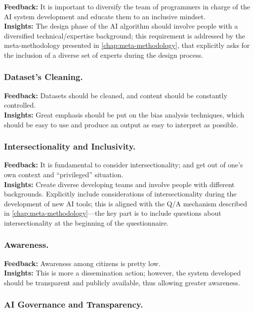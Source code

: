 \documentclass[12pt,a4paper,openright,twoside]{book}
\begin{document}
\textbf{Feedback:} It is important to diversify the team of programmers in charge of the AI system development and educate them to an inclusive mindset.
\\
\textbf{Insights:} The design phase of the AI algorithm should involve people with a diversified technical/expertise background; this requirement is addressed by the meta-methodology presented in \cref{chap:meta-methodology}, that explicitly asks for the inclusion of a diverse set of experts during the design process.

\subsubsection{Dataset's Cleaning.}

\textbf{Feedback:} Datasets should be cleaned, and content should be constantly controlled.
\\
\textbf{Insights:} Great emphasis should be put on the bias analysis techniques, which should be easy to use and produce an output as easy to interpret as possible.

\subsubsection{Intersectionality and Inclusivity.}

\textbf{Feedback:} It is fundamental to consider intersectionality; and get out of one's own context and ``privileged'' situation.
\\
\textbf{Insights:} Create diverse developing teams and involve people with different backgrounds.
%
Explicitly include considerations of intersectionality during the development of new AI tools; this is aligned with the Q/A mechanism described in \cref{chap:meta-methodology}---the key part is to include questions about intersectionality at the beginning of the questionnaire.

\subsubsection{Awareness.}

\textbf{Feedback:} Awareness among citizens is pretty low.
\\
\textbf{Insights:} This is more a dissemination action; however, the system developed should be transparent and publicly available, thus allowing greater awareness.

\subsubsection{AI Governance and Transparency.}
\end{document}
